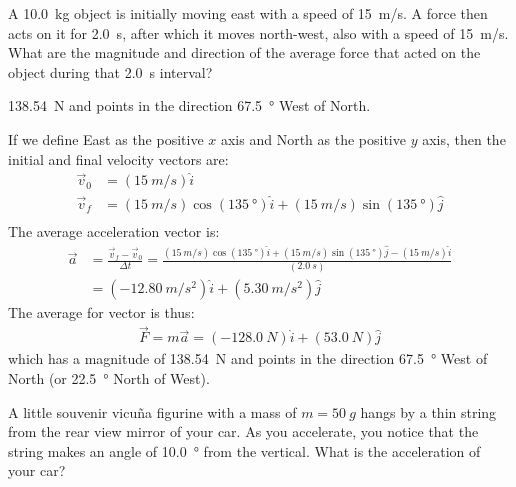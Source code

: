 \question A \SI{10.0}{kg} object is initially moving east with a speed of \SI{15}{m/s}. A force then acts on it for \SI{2.0}{s}, after which it moves north-west, also with a speed of \SI{15}{m/s}. What are the magnitude and direction of the average force that acted on the object during that \SI{2.0}{s} interval?
\begin{finalanswer}
\SI{138.54}{N} and points in the direction \SI{67.5}{\degree} West of North.
\end{finalanswer}
\begin{solution}
If we define East as the positive $x$ axis and North as the positive $y$ axis, then the initial and final velocity vectors are:
\begin{align*}
\vec v_0&=(\SI{15}{m/s})\hat i \\
\vec v_f&=(\SI{15}{m/s})\cos(\SI{135}{\degree})\hat i +(\SI{15}{m/s})\sin(\SI{135}{\degree})\hat j\\
\end{align*}
The average acceleration vector is:
\begin{align*}
\vec a &=\frac{\vec v_f-\vec v_0}{\Delta t}=\frac{(\SI{15}{m/s})\cos(\SI{135}{\degree})\hat i +(\SI{15}{m/s})\sin(\SI{135}{\degree})\hat j-(\SI{15}{m/s})\hat i }{(\SI{2.0}{s})}\\
&=(\SI{-12.80}{m/s^2})\hat i+(\SI{5.30}{m/s^2})\hat j
\end{align*}
The average for vector is thus:
\begin{align*}
\vec F = m\vec a= (\SI{-128.0}{N})\hat i+(\SI{53.0}{N})\hat j
\end{align*}
which has a magnitude of \SI{138.54}{N} and points in the direction \SI{67.5}{\degree} West of North (or \SI{22.5}{\degree} North of West). 
\end{solution}


\question A little souvenir vicu\~na figurine with a mass of $m=\SI{50}{g}$ hangs by a thin string from the rear view mirror of your car. As you accelerate, you notice that the string makes an angle of \SI{10.0}{\degree} from the vertical. What is the acceleration of your car?

